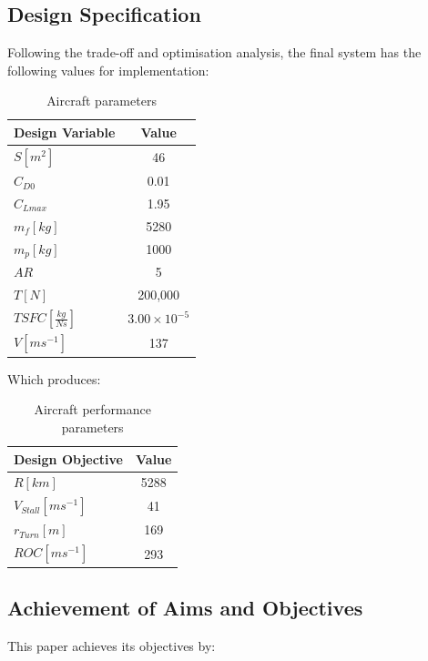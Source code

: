 \documentclass[../main.tex]{subfiles}
\begin{document}
\subsection{Design Specification}
Following the trade-off and optimisation analysis, the final system has the following values for implementation:

\begin{table}[h]

    \centering
    \begin{tabular}{lc}
        \hline
        \textbf{Design Variable} & \textbf{Value} \\
        \hline
        $S \left[m^{2}\right]$     & 46       \\
        $C_{D0}$   & 0.01     \\
        $C_{Lmax}$ & 1.95     \\
        $m_{f} \left[kg\right]$   & 5280     \\
        $m_{p}  \left[kg\right]$  & 1000     \\
        $AR$    & 5        \\
        $T  \left[N\right]$   & 200,000   \\
        $TSFC  \left[\frac{kg}{Ns}\right]$& $3.00\times10^{-5}$ \\
        $V   \left[ms^{-1}\right]$  & 137      \\
        \hline
    \end{tabular}
    \caption{Aircraft parameters}
    \label{tab:final_spec}
\end{table}

Which produces:

\begin{table}[h]
    \centering
    \begin{tabular}{lc}
        \hline
        \textbf{Design Objective} & \textbf{Value} \\
        \hline
        $R \left[km\right]$       & 5288 \\
        $V_{Stall} \left[ms^{-1}\right]$ & 41   \\
        $r_{Turn}\left[m\right]$        & 169  \\
        $ROC \left[ms^{-1}\right]$   & 293  \\
        \hline
    \end{tabular}
    \caption{Aircraft performance parameters}
    \label{tab:final_DOs}
\end{table}

\subsection{Achievement of Aims and Objectives}
This paper achieves its objectives by:
\end{document}
